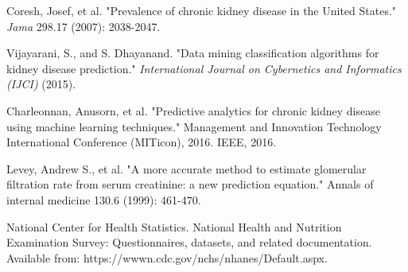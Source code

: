 \documentclass[twoside,11pt]{article}
\begin{document}
\begin{thebibliography}{...}
Coresh, Josef, et al. "Prevalence of chronic kidney disease in the United States." \textit{Jama} 298.17 (2007): 2038-2047.

Vijayarani, S., and S. Dhayanand. "Data mining classification algorithms for kidney disease prediction." \textit{International Journal on Cybernetics and Informatics (IJCI) }(2015).

Charleonnan, Anusorn, et al. "Predictive analytics for chronic kidney disease using machine learning techniques." Management and Innovation Technology International Conference (MITicon), 2016. IEEE, 2016.

Levey, Andrew S., et al. "A more accurate method to estimate glomerular filtration rate from serum creatinine: a new prediction equation." Annals of internal medicine 130.6 (1999): 461-470.

National Center for Health Statistics. National Health and Nutrition Examination Survey: Questionnaires, datasets, and related documentation. Available from: https://wwwn.cdc.gov/nchs/nhanes/Default.aspx. 

\end{thebibliography}
\end{document}
